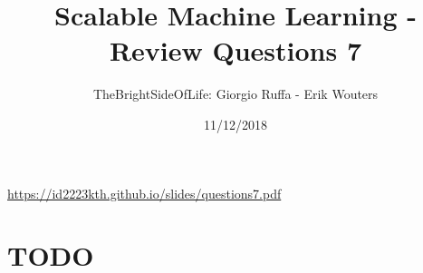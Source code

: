 \documentclass[a4paper]{article}
\title{Scalable Machine Learning - Review Questions 7}
\author{TheBrightSideOfLife: Giorgio Ruffa - Erik Wouters}
\date{11/12/2018}
\begin{document}
\maketitle

\url{https://id2223kth.github.io/slides/questions7.pdf}

\section{TODO}


{}

\end{document}
